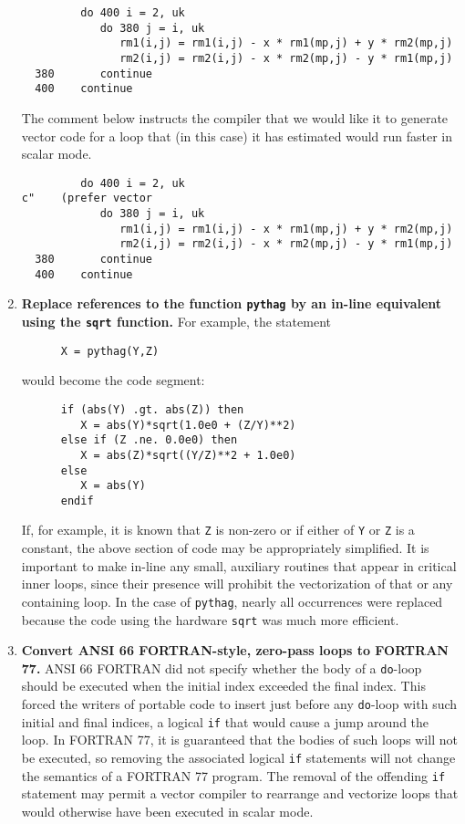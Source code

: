 \begin{enumerate}
\begin{verbatim}
         do 400 i = 2, uk
            do 380 j = i, uk
               rm1(i,j) = rm1(i,j) - x * rm1(mp,j) + y * rm2(mp,j)
               rm2(i,j) = rm2(i,j) - x * rm2(mp,j) - y * rm1(mp,j)
  380       continue
  400    continue
\end{verbatim}

The comment below instructs the compiler that we would like it to generate
vector code for a loop that (in this case) it has estimated would run faster
in scalar mode.

\begin{verbatim}
         do 400 i = 2, uk
c"    (prefer vector
            do 380 j = i, uk
               rm1(i,j) = rm1(i,j) - x * rm1(mp,j) + y * rm2(mp,j)
               rm2(i,j) = rm2(i,j) - x * rm2(mp,j) - y * rm1(mp,j)
  380       continue
  400    continue
\end{verbatim}

 \item {\bf Replace references to the function {\tt pythag} by an in-line
 equivalent using the {\tt sqrt} function.}  For example, the statement

\begin{verbatim}
      X = pythag(Y,Z)
\end{verbatim}

would become the code segment:

\begin{verbatim}
      if (abs(Y) .gt. abs(Z)) then
         X = abs(Y)*sqrt(1.0e0 + (Z/Y)**2)
      else if (Z .ne. 0.0e0) then
         X = abs(Z)*sqrt((Y/Z)**2 + 1.0e0)
      else
         X = abs(Y)
      endif
\end{verbatim}

If, for example, it is known that {\tt Z} is non-zero or if either of {\tt Y}
or {\tt Z} is a constant, the above section of code may be appropriately
simplified.  It is important to make in-line any small, auxiliary routines
that appear in critical inner loops, since their presence will prohibit the
vectorization of that or any containing loop.  In the case of {\tt pythag},
nearly all occurrences were replaced because the code using the hardware
{\tt sqrt} was much more efficient.

 \item {\bf Convert ANSI 66 FORTRAN-style, zero-pass loops to FORTRAN 77.}
ANSI 66 FORTRAN did not specify whether the body of a {\tt do}-loop should be
executed when the initial index exceeded the final index.  This forced
the writers of portable code to insert just before any {\tt do}-loop with
such initial and final indices, a logical {\tt if} that would
cause a jump around the loop.  In FORTRAN 77, it is guaranteed that the
bodies of such loops will not be executed, so removing the associated logical
{\tt if} statements will not change the semantics of a FORTRAN 77 program.
The removal of the offending {\tt if} statement may permit a vector
compiler to rearrange and vectorize loops that would otherwise have
been executed in scalar mode.


\end{enumerate}
